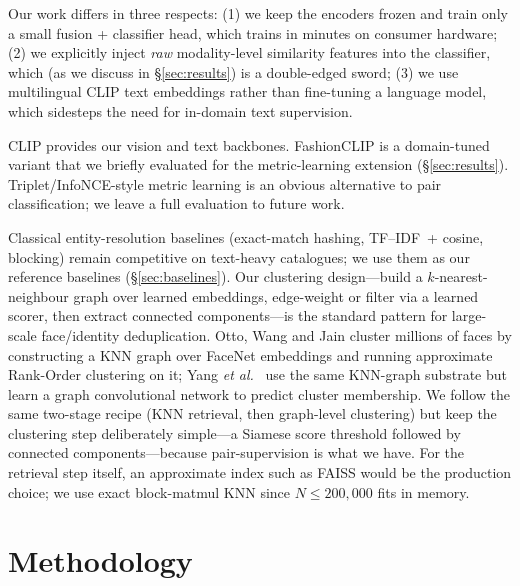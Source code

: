 \documentclass[10pt,conference]{IEEEtran}
\begin{document}
Our work differs in three respects:
(1) we keep the encoders frozen and train only a small fusion + classifier
head, which trains in minutes on consumer hardware;
(2) we explicitly inject \emph{raw} modality-level similarity features into
the classifier, which (as we discuss in \S\ref{sec:results}) is a
double-edged sword;
(3) we use multilingual CLIP text embeddings rather than fine-tuning a
language model, which sidesteps the need for in-domain text supervision.

CLIP \cite{clip} provides our vision and text backbones. FashionCLIP
\cite{fashionclip} is a domain-tuned variant that we briefly evaluated for
the metric-learning extension (\S\ref{sec:results}). Triplet/InfoNCE-style
metric learning \cite{facenet,supcon} is an obvious alternative to pair
classification; we leave a full evaluation to future work.

Classical entity-resolution baselines \cite{er_survey} (exact-match
hashing, TF--IDF~+ cosine, blocking) remain competitive on text-heavy
catalogues; we use them as our reference baselines (\S\ref{sec:baselines}).
Our clustering design---build a $k$-nearest-neighbour graph over learned
embeddings, edge-weight or filter via a learned scorer, then extract
connected components---is the standard pattern for large-scale face/identity
deduplication. Otto, Wang and Jain \cite{otto_facecluster} cluster millions
of faces by constructing a KNN graph over FaceNet embeddings and running
approximate Rank-Order clustering on it; Yang \emph{et al.}\
\cite{yang_lcluster} use the same KNN-graph substrate but learn a graph
convolutional network to predict cluster membership. We follow the same
two-stage recipe (KNN retrieval, then graph-level clustering) but keep the
clustering step deliberately simple---a Siamese score threshold followed by
connected components---because pair-supervision is what we have. For the
retrieval step itself, an approximate index such as FAISS \cite{faiss} would
be the production choice; we use exact block-matmul KNN since $N \le 200{,}000$
fits in memory.

\section{Methodology}
\label{sec:methodology}
\end{document}
